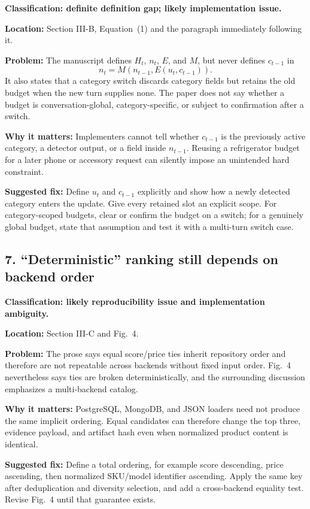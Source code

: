 \documentclass[11pt]{article}
\begin{document}
\textbf{Classification: definite definition gap; likely implementation issue.}

\textbf{Location:} Section III-B, Equation~(1) and the paragraph immediately following it.

\textbf{Problem:} The manuscript defines $H_t$, $n_t$, $E$, and $M$, but never defines $c_{t-1}$ in
\[
n_t=M\!\left(n_{t-1},E(u_t,c_{t-1})\right).
\]
It also states that a category switch discards category fields but retains the old budget when the new turn supplies none.  The paper does not say whether a budget is conversation-global, category-specific, or subject to confirmation after a switch.

\textbf{Why it matters:} Implementers cannot tell whether $c_{t-1}$ is the previously active category, a detector output, or a field inside $n_{t-1}$.  Reusing a refrigerator budget for a later phone or accessory request can silently impose an unintended hard constraint.

\textbf{Suggested fix:} Define $u_t$ and $c_{t-1}$ explicitly and show how a newly detected category enters the update.  Give every retained slot an explicit scope.  For category-scoped budgets, clear or confirm the budget on a switch; for a genuinely global budget, state that assumption and test it with a multi-turn switch case.

\subsection*{7. ``Deterministic'' ranking still depends on backend order}

\textbf{Classification: likely reproducibility issue and implementation ambiguity.}

\textbf{Location:} Section III-C and Fig.~4.

\textbf{Problem:} The prose says equal score/price ties inherit repository order and therefore are not repeatable across backends without fixed input order.  Fig.~4 nevertheless says ties are broken deterministically, and the surrounding discussion emphasizes a multi-backend catalog.

\textbf{Why it matters:} PostgreSQL, MongoDB, and JSON loaders need not produce the same implicit ordering.  Equal candidates can therefore change the top three, evidence payload, and artifact hash even when normalized product content is identical.

\textbf{Suggested fix:} Define a total ordering, for example score descending, price ascending, then normalized SKU/model identifier ascending.  Apply the same key after deduplication and diversity selection, and add a cross-backend equality test.  Revise Fig.~4 until that guarantee exists.
\end{document}
